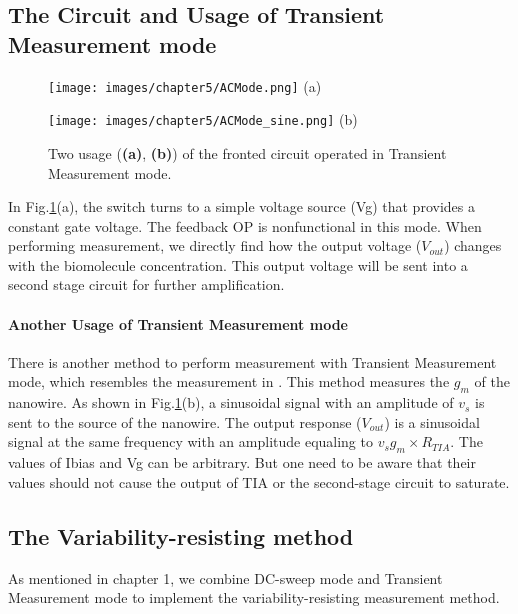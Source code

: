 \subsection{The Circuit and Usage of Transient Measurement mode} \label{sec:TrM}

\begin{figure}[!htbp]
    \centering
    \begin{minipage}[t]{0.45\textwidth}
        \texttt{[image: images/chapter5/ACMode.png]}
        \raggedleft
        (a)
    \end{minipage}
    \hfill
    \begin{minipage}[t]{0.45\textwidth}
        \texttt{[image: images/chapter5/ACMode\_sine.png]}
        \raggedleft
        (b)
    \end{minipage}
    \caption{Two usage (\textbf{(a)}, \textbf{(b)}) of the fronted circuit operated in Transient Measurement mode.}
    \label{fig:ACmode}
\end{figure}

In Fig.\ref{fig:ACmode}(a), the switch turns to a simple voltage source (Vg) that provides a constant gate voltage.
The feedback OP is nonfunctional in this mode.
When performing measurement, we directly find how the output voltage ($V_{out}$) changes with the biomolecule concentration.
This output voltage will be sent into a second stage circuit for further amplification.

\paragraph*{Another Usage of Transient Measurement mode}
There is another method to perform measurement with Transient Measurement mode, which resembles the measurement in \cite{Jlockin}.
This method measures the $g_m$ of the nanowire.
As shown in Fig.\ref{fig:ACmode}(b), a sinusoidal signal with an amplitude of $v_s$ is sent to the source of the nanowire.
The output response ($V_{out}$) is a sinusoidal signal at the same frequency with an amplitude equaling to $v_sg_m \times R_{TIA}$.
The values of Ibias and Vg can be arbitrary.
But one need to be aware that their values should not cause the output of TIA or the second-stage circuit to saturate.

\subsection{The Variability-resisting method}
As mentioned in chapter 1, we combine DC-sweep mode and Transient Measurement mode to implement the variability-resisting measurement method.

